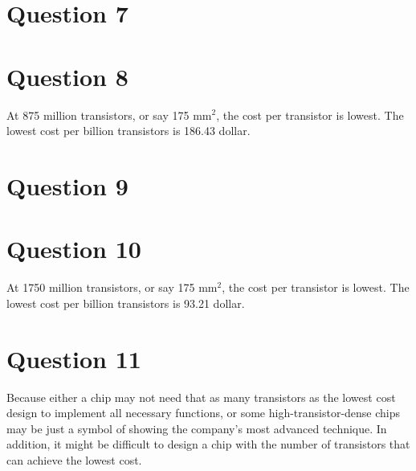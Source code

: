 \documentclass[12pt,letterpaper]{article}
\begin{document}
\section*{Question 7}
\section*{Question 8}
At 875 million transistors, or say 175 $\mbox{mm}^2$, the cost per 
transistor is lowest. The lowest cost per billion transistors is 186.43 dollar.

\section*{Question 9}
\section*{Question 10}
At 1750 million transistors, or say 175 $\mbox{mm}^2$, the cost per
transistor is lowest. The lowest cost per billion transistors is 93.21 dollar.

\section*{Question 11}
Because either a chip may not need that as many transistors as the lowest 
cost design to implement all necessary functions, or some 
high-transistor-dense chips may be just a symbol of showing the 
company's most advanced technique. In addition, it might be difficult to 
design a chip with the number of transistors that can achieve the lowest 
cost.
\end{document}
